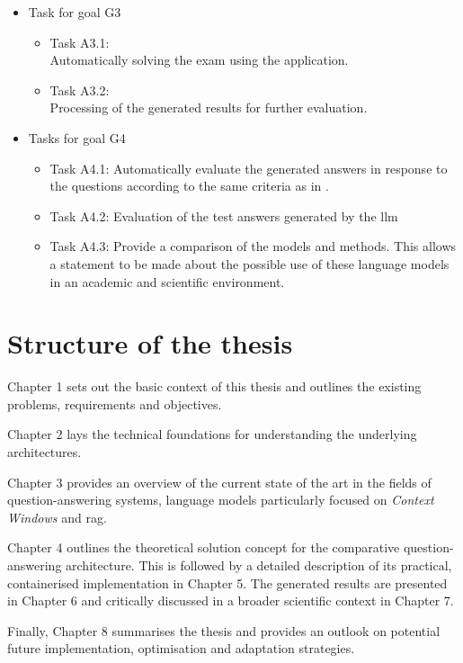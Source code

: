 \begin{itemize}
\begin{itemize}
        \end{itemize}
 \item Task for goal G3
        \begin{itemize}
        \item Task A3.1:\label{task:3_1_exam}\\
            Automatically solving the exam using the application.
        \item Task A3.2:\label{task:3_2_processing_results}\\
            Processing of the generated results for further evaluation.
        \end{itemize}
 \item Tasks for goal G4
    \begin{itemize}
         \item Task A4.1:\label{task:4_1_automatic_eval}
            Automatically evaluate the generated answers in response to the questions according to the same criteria as in \citet{Paul_Keller}.   
          \item Task A4.2:\label{task:4_2_automatic_eval_test}
          Evaluation of the test answers generated by the \ac{llm}  
          \item Task A4.3:
            Provide a comparison of the models and methods.
            This allows a statement to be made about the possible use of these language models in an academic and scientific environment.
        \end{itemize}
\end{itemize}
%
\section{Structure of the thesis}

Chapter 1 sets out the basic context of this thesis and outlines the existing problems, requirements and objectives.

Chapter 2 lays the technical foundations for understanding the underlying architectures.

Chapter 3 provides an overview of the current state of the art in the fields of question-answering systems, language models particularly focused on \textit{Context Windows} and \ac{rag}.

Chapter 4 outlines the theoretical solution concept for the comparative question-answering architecture.
This is followed by a detailed description of its practical, containerised implementation in Chapter 5.
The generated results are presented in Chapter 6 and critically discussed in a broader scientific context in Chapter 7.

Finally, Chapter 8 summarises the thesis and provides an outlook on potential future implementation, optimisation and adaptation strategies.